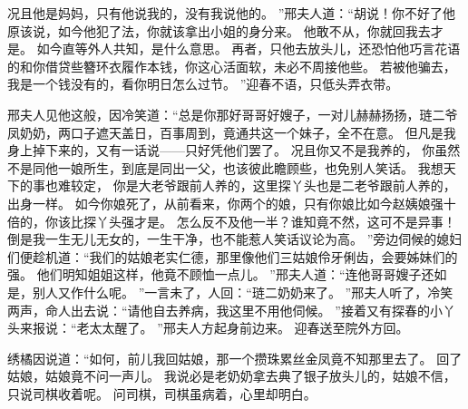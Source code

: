 况且他是妈妈，只有他说我的，没有我说他的。
”邢夫人道：“胡说！你不好了他原该说，如今他犯了法，你就该拿出小姐的身分来。
他敢不从，你就回我去才是。
如今直等外人共知，是什么意思。
再者，只他去放头儿，还恐怕他巧言花语的和你借贷些簪环衣履作本钱，你这心活面软，未必不周接他些。
若被他骗去，我是一个钱没有的，看你明日怎么过节。
”迎春不语，只低头弄衣带。
\par
邢夫人见他这般，因冷笑道：“总是你那好哥哥好嫂子，一对儿赫赫扬扬，琏二爷凤奶奶，两口子遮天盖日，百事周到，竟通共这一个妹子，全不在意。
但凡是我身上掉下来的，又有一话说——只好凭他们罢了。
况且你又不是我养的，
你虽然不是同他一娘所生，到底是同出一父，也该彼此瞻顾些，也免别人笑话。
我想天下的事也难较定，
你是大老爷跟前人养的，这里探丫头也是二老爷跟前人养的，出身一样。
如今你娘死了，从前看来，你两个的娘，只有你娘比如今赵姨娘强十倍的，你该比探丫头强才是。
怎么反不及他一半？谁知竟不然，这可不是异事！倒是我一生无儿无女的，一生干净，也不能惹人笑话议论为高。
”旁边伺候的媳妇们便趁机道：“我们的姑娘老实仁德，那里像他们三姑娘伶牙俐齿，会要姊妹们的强。
他们明知姐姐这样，他竟不顾恤一点儿。
”邢夫人道：“连他哥哥嫂子还如是，别人又作什么呢。
”一言未了，人回：“琏二奶奶来了。
”邢夫人听了，冷笑两声，命人出去说：“请他自去养病，我这里不用他伺候。
”接着又有探春的小丫头来报说：“老太太醒了。
”邢夫人方起身前边来。
迎春送至院外方回。
\par
绣橘因说道：“如何，前儿我回姑娘，那一个攒珠累丝金凤竟不知那里去了。
回了姑娘，姑娘竟不问一声儿。
我说必是老奶奶拿去典了银子放头儿的，姑娘不信，只说司棋收着呢。
问司棋，司棋虽病着，心里却明白。
